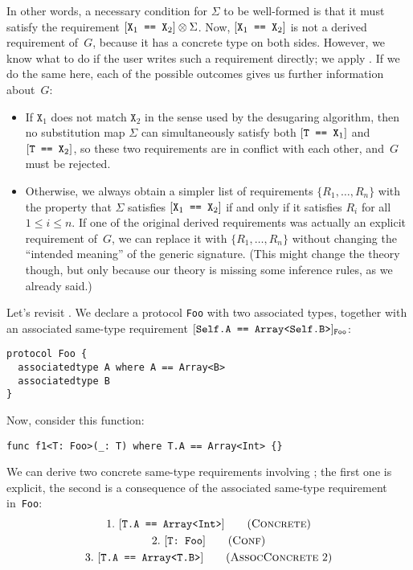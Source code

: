 \documentclass[../generics]{subfiles}
\begin{document}
In other words, a necessary condition for $\Sigma$ to be well-formed is that it must satisfy the requirement $[\texttt{$\texttt{X}_1$ == $\texttt{X}_2$}]\otimes\Sigma$. Now, $[\texttt{$\texttt{X}_1$ == $\texttt{X}_2$}]$ is not a derived requirement of~$G$, because it has a concrete type on both sides. However, we know what to do if the user writes such a requirement directly; we apply . If we do the same here, each of the possible outcomes gives us further information about~$G$:
\begin{itemize}
\item If $\texttt{X}_1$ does not match $\texttt{X}_2$ in the sense used by the desugaring algorithm, then no substitution map $\Sigma$ can simultaneously satisfy both $[\texttt{T == $\texttt{X}_1$}]$ and $[\texttt{T == $\texttt{X}_2$}]$, so these two requirements are in conflict with each other, and~$G$ must be rejected.

\item Otherwise, we always obtain a simpler list of requirements $\{R_1,\ldots,R_n\}$ with the property that $\Sigma$ satisfies $[\texttt{$\texttt{X}_1$ == $\texttt{X}_2$}]$ if and only if it satisfies $R_i$ for all $1\le i\le n$. If one of the original derived requirements was actually an explicit requirement of~$G$, we can replace it with $\{R_1,\ldots,R_n\}$ without changing the ``intended meaning'' of the generic signature. (This might change the theory though, but only because our theory is missing some inference rules, as we already said.)
\end{itemize}
Let's revisit . We declare a protocol \texttt{Foo} with two associated types, together with an associated same-type requirement $[\texttt{Self.A == Array<Self.B>}]_{\texttt{Foo}}$:
\begin{Verbatim}
protocol Foo {
  associatedtype A where A == Array<B>
  associatedtype B
}
\end{Verbatim}
Now, consider this function:
\begin{Verbatim}
func f1<T: Foo>(_: T) where T.A == Array<Int> {}
\end{Verbatim}
We can derive two concrete same-type requirements involving \tT; the first one is explicit, the second is a consequence of the associated same-type requirement in~\texttt{Foo}:
\begin{gather*}
\ConcreteStep{T.A}{Array<Int>}{1}\\
\ConfStep{T}{Foo}{2}\\
\AssocConcreteStep{2}{T.A}{Array<T.B>}{3}
\end{gather*}
\end{document}

